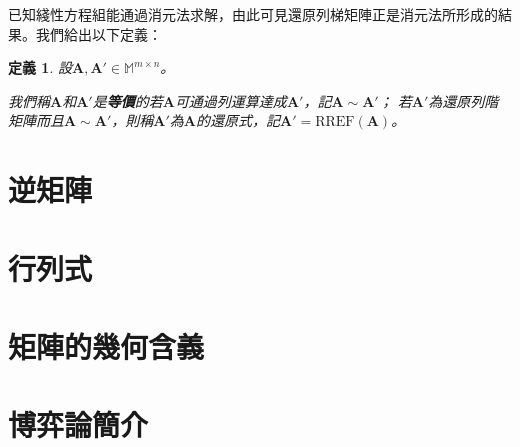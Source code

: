\documentclass[12pt]{article}
\newcommand{\rref}{\mathrm{RREF}}
\newtheorem{definition}{定義}
\begin{document}
    已知綫性方程組能通過消元法求解，由此可見還原列梯矩陣正是消元法所形成的結果。我們給出以下定義：

    \begin{definition}
        設$\mathbf{A},\mathbf{A}'\in\mathbb{M}^{m\times n}$。
        
        我們稱$\mathbf{A}$和$\mathbf{A}'$是\textbf{等價}的若$\mathbf{A}$可通過列運算達成$\mathbf{A}'$，記$\mathbf{A}\sim\mathbf{A}'$；
        若$\mathbf{A}'$為還原列階矩陣而且$\mathbf{A}\sim\mathbf{A}'$，則稱$\mathbf{A}'$為$\mathbf{A}$的還原式，記$\mathbf{A}'=\rref(\mathbf{A})$。
    \end{definition}

    \section*{逆矩陣}

    \section*{行列式}

    \section*{矩陣的幾何含義}

    \section*{博弈論簡介}
\end{document}
